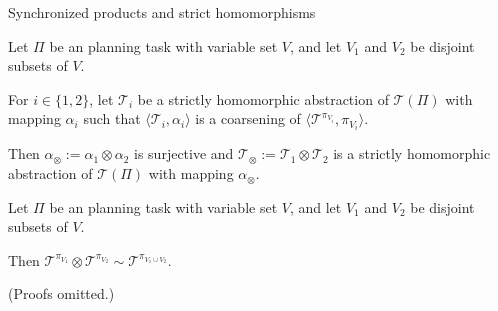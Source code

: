 \documentclass{gkibeamer}
\begin{document}
\begin{frame}{Synchronized products and strict homomorphisms}
  \begin{theorem}
    Let $\Pi$ be an {\sasplus} planning task with variable set $V$,
    and let $V_1$ and $V_2$ be disjoint subsets of $V$.

    \smallskip

    For $i \in \{1, 2\}$, let $\mathcal T_i$ be a strictly homomorphic
    abstraction of $\mathcal T(\Pi)$ with mapping $\alpha_i$ such
    that $\langle \mathcal T_i, \alpha_i\rangle$ is a coarsening of
    $\langle \mathcal T^{\pi_{V_i}}, \pi_{V_i}\rangle$.

    \medskip
    
    Then $\alpha_{\otimes} := \alpha_1 \otimes \alpha_2$ is surjective
    and $\mathcal T_{\otimes} := \mathcal T_1 \otimes \mathcal T_2$ is
    a strictly homomorphic abstraction of $\mathcal T(\Pi)$ with mapping
    $\alpha_{\otimes}$.
  \end{theorem}

  \medskip

  \begin{corollary}
    Let $\Pi$ be an {\sasplus} planning task with variable set $V$,
    and let $V_1$ and $V_2$ be disjoint subsets of $V$.

    Then $\mathcal T^{\pi_{V_1}} \otimes \mathcal T^{\pi_{V_2}} \sim
    \mathcal T^{\pi_{V_1 \cup V_2}}$.
  \end{corollary}

  (Proofs omitted.)


\end{frame}

\end{document}
